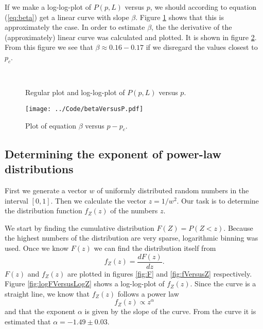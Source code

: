 \documentclass[12pt]{article}
\newcommand{\bdi}{\begin{displaymath}}
\newcommand{\edi}{\end{displaymath}}
\begin{document}
If we make a log-log-plot of $P(p,L)$ versus $p$, we should according to equation (\ref{eq:beta}) get a linear curve with slope $\beta$. Figure \ref{fig:pVersusP} shows that this is approximately the case. In order to estimate
$\beta$, the the derivative of the (approximately) linear curve was calculated and plotted. It is shown in figure \ref{fig:beta}. From this figure we see that $\beta\approx0.16-0.17$ if we disregard the values closest to $p_c$.

\begin{figure}[!ht]
    \begin{center}
        \hspace{5mm}
        \\ 
    \end{center}
    \caption{Regular plot and log-log-plot of $P(p,L)$ versus $p$.}
    \label{fig:pVersusP}
\end{figure}

\begin{figure}[!ht]
    \begin{center}
	\texttt{[image: ../Code/betaVersusP.pdf]}
	\caption{Plot of equation $\beta$ versus $p-p_c$.}
	\label{fig:beta}
    \end{center}
\end{figure}



\subsection*{Determining the exponent of power-law distributions}
First we generate a vector $w$ of uniformly distributed random numbers in the interval $[0, 1]$. Then we calculate the vector $z=1/w^2$. Our task is to determine the distribution function $f_Z(z)$ of the
numbers $z$.

We start by finding the cumulative distribution $F(Z) = P(Z<z)$. Because the highest numbers of the distribution are very sparse, logarithmic binning was used. Once we know $F(z)$ we can find the distribution
itself from
\bdi
f_Z(z) = \frac{dF(z)}{dz}.
\edi
$F(z)$ and $f_Z(z)$ are plotted in figures \ref{fig:F} and \ref{fig:fVersusZ} respectively. Figure \ref{fig:logFVersusLogZ} shows a log-log-plot of $f_Z(z)$. Since the curve is a straight line, we know that
$f_Z(z)$ follows a power law
\bdi
f_Z(z) \propto z^\alpha
\edi
and that the exponent $\alpha$ is given by the slope of the curve. From the curve it is estimated that $\alpha = -1.49 \pm 0.03$.
\end{document}
